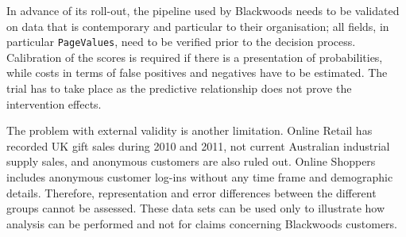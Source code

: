 In advance of its roll-out, the pipeline used by Blackwoods needs to be validated on data that is contemporary and particular to their organisation; all fields, in particular \texttt{PageValues}, need to be verified prior to the decision process. Calibration of the scores is required if there is a presentation of probabilities, while costs in terms of false positives and negatives have to be estimated. The trial has to take place as the predictive relationship does not prove the intervention effects.

The problem with external validity is another limitation. Online Retail has recorded UK gift sales during 2010 and 2011, not current Australian industrial supply sales, and anonymous customers are also ruled out. Online Shoppers includes anonymous customer log-ins without any time frame and demographic details. Therefore, representation and error differences between the different groups cannot be assessed. These data sets can be used only to illustrate how analysis can be performed and not for claims concerning Blackwoods customers.

